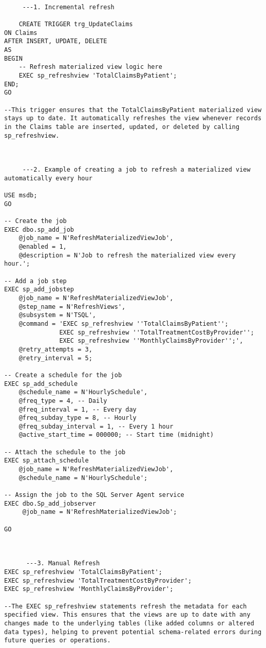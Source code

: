          \begin{lstlisting}[style=sqlstyle, caption={Maintenance and Refresh Strategies}, label=lst:Maintenance_and_Refresh_Strategies]

     ---1. Incremental refresh 
     
    CREATE TRIGGER trg_UpdateClaims
ON Claims
AFTER INSERT, UPDATE, DELETE
AS
BEGIN
    -- Refresh materialized view logic here
    EXEC sp_refreshview 'TotalClaimsByPatient';
END;
GO

--This trigger ensures that the TotalClaimsByPatient materialized view stays up to date. It automatically refreshes the view whenever records in the Claims table are inserted, updated, or deleted by calling sp_refreshview.



     ---2. Example of creating a job to refresh a materialized view automatically every hour

USE msdb;
GO

-- Create the job
EXEC dbo.sp_add_job
    @job_name = N'RefreshMaterializedViewJob',
    @enabled = 1,
    @description = N'Job to refresh the materialized view every hour.';

-- Add a job step
EXEC sp_add_jobstep
    @job_name = N'RefreshMaterializedViewJob',
    @step_name = N'RefreshViews',
    @subsystem = N'TSQL',
    @command = 'EXEC sp_refreshview ''TotalClaimsByPatient'';
               EXEC sp_refreshview ''TotalTreatmentCostByProvider'';
               EXEC sp_refreshview ''MonthlyClaimsByProvider'';',
    @retry_attempts = 3,
    @retry_interval = 5;

-- Create a schedule for the job
EXEC sp_add_schedule
    @schedule_name = N'HourlySchedule',
    @freq_type = 4, -- Daily
    @freq_interval = 1, -- Every day
    @freq_subday_type = 8, -- Hourly
    @freq_subday_interval = 1, -- Every 1 hour
    @active_start_time = 000000; -- Start time (midnight)

-- Attach the schedule to the job
EXEC sp_attach_schedule
    @job_name = N'RefreshMaterializedViewJob',
    @schedule_name = N'HourlySchedule';

-- Assign the job to the SQL Server Agent service
EXEC dbo.Sp_add_jobserver
     @job_name = N'RefreshMaterializedViewJob';

GO



      ---3. Manual Refresh
EXEC sp_refreshview 'TotalClaimsByPatient';
EXEC sp_refreshview 'TotalTreatmentCostByProvider';
EXEC sp_refreshview 'MonthlyClaimsByProvider';

--The EXEC sp_refreshview statements refresh the metadata for each specified view. This ensures that the views are up to date with any changes made to the underlying tables (like added columns or altered data types), helping to prevent potential schema-related errors during future queries or operations.
        \end{lstlisting}